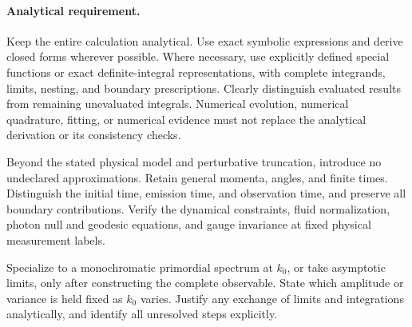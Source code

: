 \documentclass[11pt]{article}
\begin{document}
\paragraph{Analytical requirement.}
Keep the entire calculation analytical. Use exact symbolic expressions
and derive closed forms wherever possible. Where necessary, use
explicitly defined special functions or exact definite-integral
representations, with complete integrands, limits, nesting, and boundary
prescriptions. Clearly distinguish evaluated results from remaining
unevaluated integrals. Numerical evolution, numerical quadrature,
fitting, or numerical evidence must not replace the analytical
derivation or its consistency checks.

Beyond the stated physical model and perturbative truncation, introduce
no undeclared approximations. Retain general momenta, angles, and finite
times. Distinguish the initial time, emission time, and observation time,
and preserve all boundary contributions. Verify the dynamical
constraints, fluid normalization, photon null and geodesic equations,
and gauge invariance at fixed physical measurement labels.

Specialize to a monochromatic primordial spectrum at $k_0$, or take
asymptotic limits, only after constructing the complete observable.
State which amplitude or variance is held fixed as $k_0$ varies.
Justify any exchange of limits and integrations analytically, and
identify all unresolved steps explicitly.
\end{document}
